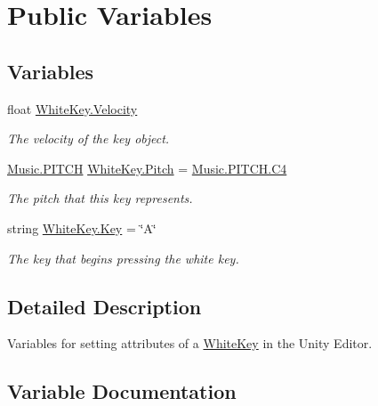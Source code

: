 \hypertarget{group___white_key_pub_var}{}\section{Public Variables}
\label{group___white_key_pub_var}
\subsection*{Variables}
\begin{DoxyCompactItemize}
\item 
float \hyperlink{group___white_key_pub_var_gacecf2bff47104955b5dae63840443744}{White\+Key.\+Velocity}
\begin{DoxyCompactList}\small\item\em The velocity of the key object. \end{DoxyCompactList}\item 
\hyperlink{group___music_enums_ga508f69b199ea518f935486c990edac1d}{Music.\+P\+I\+T\+CH} \hyperlink{group___white_key_pub_var_ga1ddd98b85ba069defc7cf47d25f625f4}{White\+Key.\+Pitch} = \hyperlink{group___music_enums_gga508f69b199ea518f935486c990edac1dab713e6323a68d3ddabf4855826c50148}{Music.\+P\+I\+T\+C\+H.\+C4}
\begin{DoxyCompactList}\small\item\em The pitch that this key represents. \end{DoxyCompactList}\item 
string \hyperlink{group___white_key_pub_var_gab24447e9dd54dbb443a0869b954fef66}{White\+Key.\+Key} = \char`\"{}A\char`\"{}
\begin{DoxyCompactList}\small\item\em The key that begins pressing the white key. \end{DoxyCompactList}\end{DoxyCompactItemize}


\subsection{Detailed Description}
Variables for setting attributes of a \hyperlink{class_white_key}{White\+Key} in the Unity Editor. 

\subsection{Variable Documentation}
\mbox{\label{group___white_key_pub_var_gab24447e9dd54dbb443a0869b954fef66}} 

